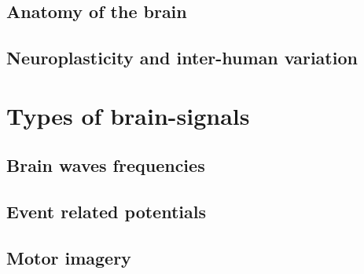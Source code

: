 \lipsum[1-3]



\subsection{Anatomy of the brain}
\label{subsec:biomedical_signals_origin_anatomy_brain}

\lipsum[1-4]


\subsection{Neuroplasticity and inter-human variation}
\label{subsec:biomedical_signals_origin_general_brain_layout}

\lipsum[1-3]


\section{Types of brain-signals}
\label{sec:biomedical_signals_type_of_signals}

\lipsum[1-2]


\subsection{Brain waves frequencies}
\label{subsec:biomedical_signals_type_of_signals_brain_wave}

\lipsum[1-2]


\subsection{Event related potentials}
\label{subsec:biomedical_signals_type_of_signals_erp}

\lipsum[1-2]


\subsection{Motor imagery}
\label{subsec:biomedical_signals_type_of_signals_motor_imagery}

